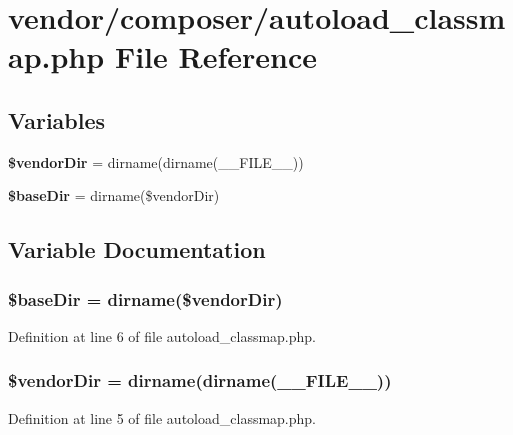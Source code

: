 \section{vendor/composer/autoload\+\_\+classmap.php File Reference}
\label{autoload__classmap_8php}
\subsection*{Variables}
\begin{DoxyCompactItemize}
\item 
{\bf \$vendor\+Dir} = dirname(dirname(\+\_\+\+\_\+\+F\+I\+L\+E\+\_\+\+\_\+))
\item 
{\bf \$base\+Dir} = dirname(\$vendor\+Dir)
\end{DoxyCompactItemize}


\subsection{Variable Documentation}
\subsubsection[{\$base\+Dir}]{\setlength{\rightskip}{0pt plus 5cm}\$base\+Dir = dirname(\$vendor\+Dir)}\label{autoload__classmap_8php_a873fc20cf44ad2f766893e95aab8df78}


Definition at line 6 of file autoload\+\_\+classmap.\+php.

\subsubsection[{\$vendor\+Dir}]{\setlength{\rightskip}{0pt plus 5cm}\$vendor\+Dir = dirname(dirname(\+\_\+\+\_\+\+F\+I\+L\+E\+\_\+\+\_\+))}\label{autoload__classmap_8php_a7fbc3633c79d7461383710e09d497fb0}


Definition at line 5 of file autoload\+\_\+classmap.\+php.

